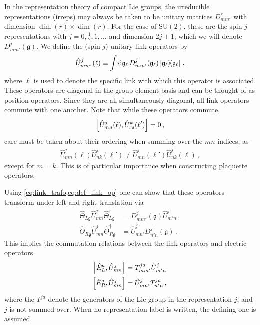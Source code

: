 \documentclass[reprint,superscriptaddress,pra,nofootinbib,preprintnumbers,floatfix]{revtex4-1}
\providecommand{\sutwo}{$\mathrm{SU}(2)$\xspace}
\providecommand{\g}{{\mathfrak{g}}}
\begin{document}
In the representation theory of compact Lie groups, the irreducible representations (irreps) may always be taken to be unitary matrices $D^r_{m m'}$ with dimension $\dim(r) \times \dim(r)$.
%
For the case of \sutwo, these are the spin-$j$ representations with $j=0,\frac{1}{2},1, \dotsc$ and dimension $2j+1$, which we will denote $D^j_{m m'}(\g)$. 
%
We define the (spin-$j$) unitary link operators by
%
\begin{equation}
\label{eq:def_link_op}
\hat{U}^j_{mm'}(\ell) \equiv \int\dd{\g_\ell} D^j_{{mm'}}(\g_\ell) \op{\g_\ell} \,,
\end{equation}
%
where $\ell$ is used to denote the specific link with which this operator is associated.
%
These operators are diagonal in the group element basis and can be thought of as position operators. 
%
Since they are all simultaneously diagonal, all link operators commute with one another. 
%
Note that while these operators commute,
%
\begin{equation}
  \comm{\hat{U}^j_{mn}(\ell)}{\hat{U}^k_{rs}(\ell')} = 0 \,,
\end{equation}
%
care must be taken about their ordering when summing over the $mn$ indices, as 
%
\begin{align}
\hat U^j_{mn}(\ell)\hat U^j_{nk}(\ell') \neq \hat U^j_{mn}(\ell')\hat U^j_{nk}(\ell)
\,,
\end{align}
%
except for $m = k$. 
%
This is of particular importance when constructing plaquette operators.


Using \cref{eq:link_trafo,eq:def_link_op} one can show that these operators transform under left and right translation via
%
\begin{equation}\label{eq:U_translation}
  \begin{split}
    \hat{\Theta}_{L\g} \hat{U}^j_{mn} \hat{\Theta}^\dagger_{L\g}
      &= D^j_{{m}{m'}}(\g) \hat{U}^j_{m'n} \,, \\
    \hat{\Theta}_{R\g} \hat{U}^j_{mn} \hat{\Theta}^\dagger_{R\g}
      &= \hat{U}^j_{mn'} D^j_{n'n}(\g) \,.
  \end{split}
\end{equation}
%
This implies the commutation relations between the link operators and electric operators
%
\begin{equation}\label{eq:EUcommutators}
  \begin{split}
    \comm{\hat{E}_L^a}{\hat{U}^j_{mn}} &= T^{ja}_{mm'}\hat U^j_{m'n} \, \\
    \comm{\hat{E}_R^a}{\hat{U}^j_{mn}} &= \hat{U}^j_{mn'}T^{ja}_{n'n} \,,
  \end{split}
\end{equation}
%
where the $T^{ja}$ denote the generators of the Lie group in the representation $j$, and $j$ is not summed over. 
%
When no representation label is written, the defining one is assumed. 
\end{document}
